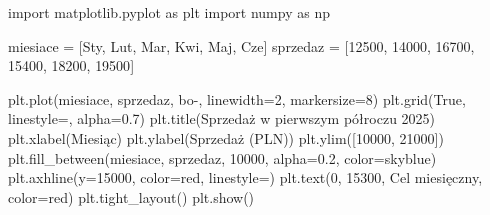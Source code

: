 \documentclass[
  polish,
  letterpaper,
  DIV=11,
  numbers=noendperiod]{scrreprt}
\newenvironment{Shaded}{\begin{snugshade}}{\end{snugshade}}
\newcommand{\DecValTok}[1]{\textcolor[rgb]{0.68,0.00,0.00}{#1}}
\newcommand{\FloatTok}[1]{\textcolor[rgb]{0.68,0.00,0.00}{#1}}
\newcommand{\ImportTok}[1]{\textcolor[rgb]{0.00,0.46,0.62}{#1}}
\newcommand{\NormalTok}[1]{\textcolor[rgb]{0.00,0.23,0.31}{#1}}
\newcommand{\OperatorTok}[1]{\textcolor[rgb]{0.37,0.37,0.37}{#1}}
\newcommand{\StringTok}[1]{\textcolor[rgb]{0.13,0.47,0.30}{#1}}
\newcommand{\VariableTok}[1]{\textcolor[rgb]{0.07,0.07,0.07}{#1}}
\begin{document}
\begin{Shaded}
\begin{Highlighting}[]
\ImportTok{import}\NormalTok{ matplotlib.pyplot }\ImportTok{as}\NormalTok{ plt}
\ImportTok{import}\NormalTok{ numpy }\ImportTok{as}\NormalTok{ np}

\NormalTok{miesiace }\OperatorTok{=}\NormalTok{ [}\StringTok{\textquotesingle{}Sty\textquotesingle{}}\NormalTok{, }\StringTok{\textquotesingle{}Lut\textquotesingle{}}\NormalTok{, }\StringTok{\textquotesingle{}Mar\textquotesingle{}}\NormalTok{, }\StringTok{\textquotesingle{}Kwi\textquotesingle{}}\NormalTok{, }\StringTok{\textquotesingle{}Maj\textquotesingle{}}\NormalTok{, }\StringTok{\textquotesingle{}Cze\textquotesingle{}}\NormalTok{]}
\NormalTok{sprzedaz }\OperatorTok{=}\NormalTok{ [}\DecValTok{12500}\NormalTok{, }\DecValTok{14000}\NormalTok{, }\DecValTok{16700}\NormalTok{, }\DecValTok{15400}\NormalTok{, }\DecValTok{18200}\NormalTok{, }\DecValTok{19500}\NormalTok{]}

\NormalTok{plt.plot(miesiace, sprzedaz, }\StringTok{\textquotesingle{}bo{-}\textquotesingle{}}\NormalTok{, linewidth}\OperatorTok{=}\DecValTok{2}\NormalTok{, markersize}\OperatorTok{=}\DecValTok{8}\NormalTok{)}
\NormalTok{plt.grid(}\VariableTok{True}\NormalTok{, linestyle}\OperatorTok{=}\StringTok{\textquotesingle{}{-}{-}\textquotesingle{}}\NormalTok{, alpha}\OperatorTok{=}\FloatTok{0.7}\NormalTok{)}
\NormalTok{plt.title(}\StringTok{\textquotesingle{}Sprzedaż w pierwszym półroczu 2025\textquotesingle{}}\NormalTok{)}
\NormalTok{plt.xlabel(}\StringTok{\textquotesingle{}Miesiąc\textquotesingle{}}\NormalTok{)}
\NormalTok{plt.ylabel(}\StringTok{\textquotesingle{}Sprzedaż (PLN)\textquotesingle{}}\NormalTok{)}
\NormalTok{plt.ylim([}\DecValTok{10000}\NormalTok{, }\DecValTok{21000}\NormalTok{])}
\NormalTok{plt.fill\_between(miesiace, sprzedaz, }\DecValTok{10000}\NormalTok{, alpha}\OperatorTok{=}\FloatTok{0.2}\NormalTok{, color}\OperatorTok{=}\StringTok{\textquotesingle{}skyblue\textquotesingle{}}\NormalTok{)}
\NormalTok{plt.axhline(y}\OperatorTok{=}\DecValTok{15000}\NormalTok{, color}\OperatorTok{=}\StringTok{\textquotesingle{}red\textquotesingle{}}\NormalTok{, linestyle}\OperatorTok{=}\StringTok{\textquotesingle{}{-}{-}\textquotesingle{}}\NormalTok{)}
\NormalTok{plt.text(}\DecValTok{0}\NormalTok{, }\DecValTok{15300}\NormalTok{, }\StringTok{\textquotesingle{}Cel miesięczny\textquotesingle{}}\NormalTok{, color}\OperatorTok{=}\StringTok{\textquotesingle{}red\textquotesingle{}}\NormalTok{)}
\NormalTok{plt.tight\_layout()}
\NormalTok{plt.show()}
\end{Highlighting}
\end{Shaded}
\end{document}
